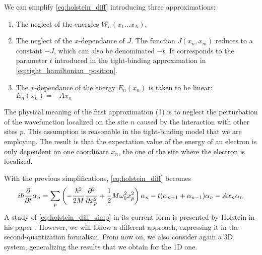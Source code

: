 We can simplify \cref{eq:holstein_diff} introducing three approximations:
\begin{enumerate}
    \item The neglect of the energies $ W_n(x_1 \dots x_N)$.
    \item The neglect of the $x$-dependance of $J$. The function $J(x_n, x_m)$ reduces to a constant $-J$, which can also be denominated $-t$. It corresponds to the parameter $t$ introduced in the tight-binding approximation in \cref{eq:tight_hamiltonian_position}.
    \item The $x$-dependance of the energy $E_n(x_n)$ is taken to be linear: $    E_n(x_n) = - A x_n$
\end{enumerate}
The physical meaning of the first approximation (1) is to neglect the perturbation of the wavefunction localized on the site $n$ caused by the interaction with other sites $p$. This assumption is reasonable in the tight-binding model that we are employing. The result is that the expectation value of the energy of an electron is only dependent on one coordinate $x_n$, the one of the site where the electron is localized.

With the previous simplifications, \cref{eq:holstein_diff} becomes
\begin{equation} \label{eq:holstein_diff_simp}
    i\hslash\pdv{}{t} \alpha_n = \sum_p\left( -\frac{\hslash^2}{2M} \pdv[2]{}{x_p} + \frac{1}{2} M \omega_0^2 x_p^2 \right) \alpha_n - t (\alpha_{n+1}+\alpha_{n-1})\alpha_n
    - A x_n \alpha_n
\end{equation}
A study of \cref{eq:holstein_diff_simp} in its current form is presented by Holstein in his paper \cite{holstein1959}. However, we will follow a different approach, expressing it in the second-quantization formalism. From now on, we also consider again a 3D system, generalizing the results that we obtain for the 1D one.

